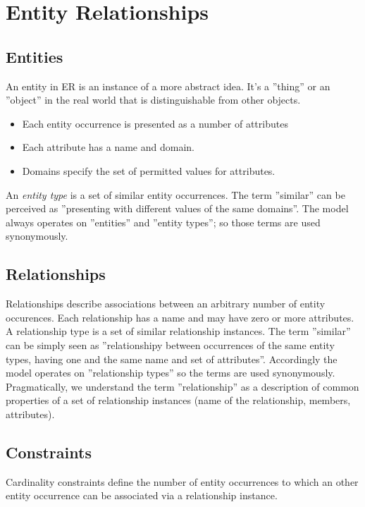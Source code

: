 \documentclass[a4paper,twocolumn]{article}
\begin{document}
\section{Entity Relationships}

\subsection{Entities}

An entity in ER is an instance of a more abstract idea. It's a
''thing'' or an ''object'' in the real world that is distinguishable
from other objects.

\begin{itemize}
  \item Each entity occurrence is presented as a number of attributes
  \item Each attribute has a name and domain.
  \item Domains specify the set of permitted values for attributes.
\end{itemize}

An \emph{entity type} is a set of similar entity occurrences.
The term ''similar'' can be perceived as ''presenting with different
values of the same domains''. The model always operates on ''entities''
and ''entity types''; so those terms are used synonymously.

\subsection{Relationships}

Relationships describe associations between an arbitrary number of
entity occurences. Each relationship has a name and may have zero
or more attributes. A relationship type is a set of similar
relationship instances. The term ''similar'' can be simply seen
as ''relationshipy between occurrences of the same entity types,
having one and the same name and set of attributes''.
Accordingly the model operates on ''relationship types'' so the terms
are used synonymously. Pragmatically, we understand the term
''relationship'' as a description of common properties of a set
of relationship instances (name of the relationship, members, attributes).

\subsection{Constraints}

Cardinality constraints define the number of entity occurrences to which
an other entity occurrence can be associated via a relationship instance.
\end{document}
